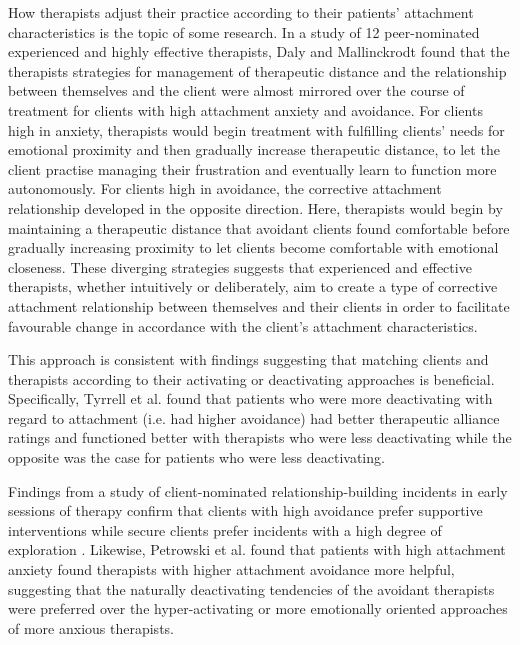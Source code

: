 \documentclass[12pt]{report}
\begin{document}
How therapists adjust their practice according to their patients' attachment characteristics is the topic of some research.
In a study of 12 peer-nominated experienced and highly effective therapists, Daly and Mallinckrodt \cite{Daly2009} found that the therapists strategies for management of therapeutic distance and the relationship between themselves and the client were almost mirrored over the course of treatment for clients with high attachment anxiety and avoidance.
For clients high in anxiety, therapists would begin treatment with fulfilling clients' needs for emotional proximity and then gradually increase therapeutic distance, to let the client practise managing their frustration and eventually learn to function more autonomously.
For clients high in avoidance, the corrective attachment relationship developed in the opposite direction. Here, therapists would begin by maintaining a therapeutic distance that avoidant clients found comfortable before gradually increasing proximity to let clients become comfortable with emotional closeness.
These diverging strategies suggests that experienced and effective therapists, whether intuitively or deliberately, aim to create a type of corrective attachment relationship between themselves and their clients in order to facilitate favourable change in accordance with the client's attachment characteristics.

This approach is consistent with findings suggesting that matching clients and therapists according to their activating or deactivating approaches is beneficial.
Specifically, Tyrrell et al. \cite{Tyrrell1999} found that patients who were more deactivating with regard to attachment (i.e. had higher avoidance) had better therapeutic alliance ratings and functioned better with therapists who were less deactivating while the opposite was the case for patients who were less deactivating.

Findings from a study of client-nominated relationship-building incidents in early sessions of therapy confirm that clients with high avoidance prefer supportive interventions while secure clients prefer incidents with a high degree of exploration \cite{Janzen2010}.
Likewise, Petrowski et al. \cite{Petrowski2011} found that patients with high attachment anxiety found therapists with higher attachment avoidance more helpful, suggesting that the naturally deactivating tendencies of the avoidant therapists were preferred over the hyper-activating or more emotionally oriented approaches of more anxious therapists.
\end{document}
